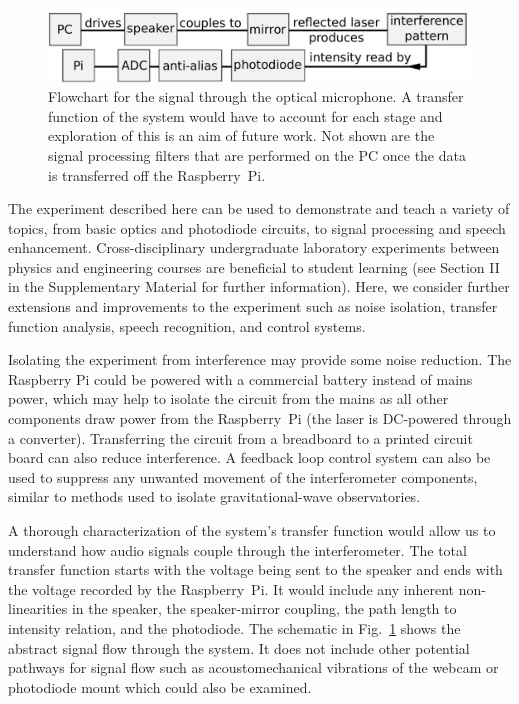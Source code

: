 \documentclass[paper-main.tex]{subfiles}
\begin{document}
\begin{figure}
    \includegraphics[width=.8\textwidth]{figures/pipeline_nobox.pdf}
	\caption{\label{fig:pipeline_highlighted}
Flowchart for the signal through the optical microphone. 
A transfer function of the system would have to account for each stage and exploration of this is an aim of future work. 
Not shown are the signal processing filters that are performed on the PC once the data is transferred off the Raspberry~Pi.
}
\end{figure}


The experiment described here can be used to demonstrate and teach a variety of topics, from basic optics and photodiode circuits, to signal processing and speech enhancement. 
Cross-disciplinary undergraduate laboratory experiments between physics and engineering courses are beneficial to student learning (see Section II in the Supplementary Material for further information). 
Here, we consider further extensions and improvements to the experiment such as noise isolation, transfer function analysis, speech recognition, and control systems.


Isolating the experiment from interference may provide some noise reduction. 
The Raspberry Pi could be powered with a commercial battery instead of mains power, which may help to isolate the circuit from the mains as all other components draw power from the Raspberry~Pi (the laser is DC-powered through a converter).
Transferring the circuit from a breadboard to a printed circuit board can also reduce interference.\cite{elfekey2013design}
A feedback loop control system can also be used to suppress any unwanted movement of the interferometer components,\citep{abbott2017exploring, Sekiguchi:2016bmv, verhoeven2009robust} similar to methods used to isolate gravitational-wave observatories. 


A thorough characterization of the system's transfer function would allow us to understand how audio signals couple through the interferometer. 
The total transfer function starts with the voltage being sent to the speaker and ends with the voltage recorded by the Raspberry~Pi. 
It would include any inherent non-linearities in the speaker, the speaker-mirror coupling, the path length to intensity relation, and the photodiode. 
The schematic in Fig.~\ref{fig:pipeline_highlighted} shows the abstract signal flow through the system.
It does not include other potential pathways for signal flow such as acoustomechanical vibrations of the webcam or photodiode mount which could also be examined.
\end{document}
